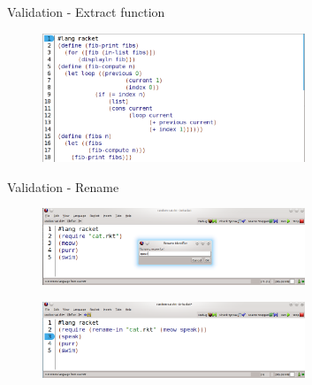 \documentclass[xcolor=dvipsnames, 14pt]{beamer}
\begin{document}
\begin{frame}{Validation - Extract function}
\begin{figure}[htbp]
  \centering
  \includegraphics[width=0.7\textwidth]{img/fibonacci-extracted-compute.png}
  \label{fig:fib-extract-two}
\end{figure}
\end{frame}
\begin{frame}{Validation - Rename}
\begin{figure}[htbp]
  \centering
  \includegraphics[width=0.7\textwidth]{img/renameV2-Correct-1.png}
  \label{fig:RenameCorrectBefore}
\end{figure}

\begin{figure}[htbp]
  \centering
  \includegraphics[width=0.7\textwidth]{img/renameV2-Correct-2.png}
  \label{fig:RenameCorrectAfter}
\end{figure}
\end{frame}
\end{document}
